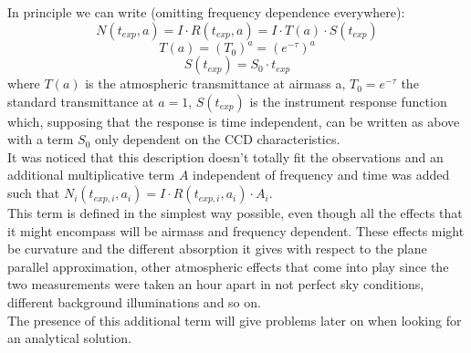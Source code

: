 \documentclass[a4paper]{article}
\begin{document}
\begin{multicols}{2}
			In principle we can write (omitting frequency dependence everywhere):
			\begin{equation}
				N(t_{exp}, a) = I \cdot R(t_{exp}, a) = I \cdot T(a) \cdot S(t_{exp})
			\end{equation}
			\begin{equation}
				T(a) = (T_0)^a = (e^{-\tau})^a
			\end{equation}
			\begin{equation}
				S(t_{exp}) = S_0 \cdot t_{exp}
			\end{equation}
			where $T(a)$ is the atmospheric transmittance at airmass a, $T_0 = e^{-\tau}$ the standard transmittance at $a = 1$, $S(t_{exp})$ is the instrument response function which, supposing that the response is time independent, can be written as above with a term $S_0$ only dependent on the CCD characteristics.\\
			
			It was noticed that this description doesn't totally fit the observations and an additional multiplicative term $A$ independent of frequency and time was added such that $N_i(t_{exp,i}, a_i) = I \cdot R(t_{exp,i}, a_i) \cdot A_i$.\\
			This term is defined in the simplest way possible, even though all the effects that it might encompass will be airmass and frequency dependent. These effects might be curvature and the different absorption it gives with respect to the plane parallel approximation, other atmospheric effects that come into play since the two measurements were taken an hour apart in not perfect sky conditions, different background illuminations and so on.\\
			The presence of this additional term will give problems later on when looking for an analytical solution.\\
			

\end{multicols}
\end{document}
